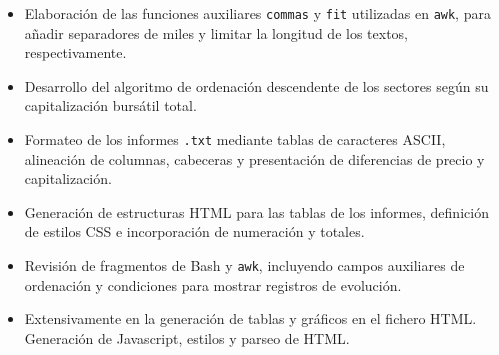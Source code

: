 \documentclass[11pt,a4paper]{article}
\begin{document}
\begin{itemize}
  \item Elaboración de las funciones auxiliares \texttt{commas} y
  \texttt{fit} utilizadas en \texttt{awk}, para añadir separadores de
  miles y limitar la longitud de los textos, respectivamente.

  \item Desarrollo del algoritmo de ordenación descendente de los
  sectores según su capitalización bursátil total.

  \item Formateo de los informes \texttt{.txt} mediante tablas de caracteres
  ASCII, alineación de columnas, cabeceras y presentación de
  diferencias de precio y capitalización.

  \item Generación de estructuras HTML para las tablas de los
  informes, definición de estilos CSS e incorporación de numeración
  y totales.

  \item Revisión de fragmentos de Bash y \texttt{awk}, incluyendo
  campos auxiliares de ordenación y condiciones para mostrar
  registros de evolución.

  \item Extensivamente en la generación de tablas y gráficos en el fichero HTML. Generación de Javascript, estilos y parseo de HTML.

\end{itemize}
\end{document}
